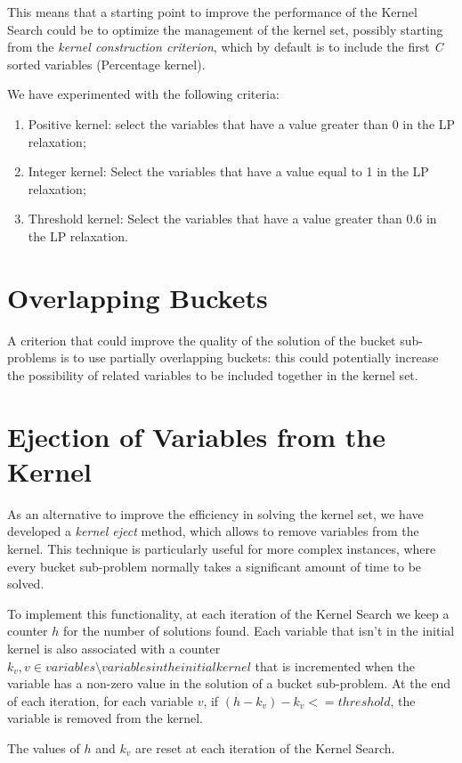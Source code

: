 This means that a starting point to improve the performance of the Kernel Search
could be to optimize the management of the kernel set,
possibly starting from the \textit{kernel construction criterion},
which by default is to include the first \textit{C} sorted variables
(Percentage kernel).

We have experimented with the following criteria:
\begin{enumerate}
    \item Positive kernel: select the variables that have a value greater than 0 in the LP relaxation;
    \item Integer kernel: Select the variables that have a value equal to 1 in the LP relaxation;
    \item Threshold kernel: Select the variables that have a value greater than 0.6
    in the LP relaxation.
\end{enumerate}


\section{Overlapping Buckets}
A criterion that could improve the quality of the solution of the bucket
sub-problems is to use partially overlapping buckets:
this could potentially increase the possibility of related
variables to be included together in the kernel set.


\section{Ejection of Variables from the Kernel}
As an alternative to improve the efficiency in solving the kernel set,
we have developed a \textit{kernel eject} method, which allows to remove variables from the kernel.
This technique is particularly useful for more complex instances, where every
bucket sub-problem normally takes a significant amount of time to be solved.

To implement this functionality, at each iteration of the Kernel Search
we keep a counter \(h\) for the number of solutions found.
Each variable that isn't in the initial kernel
is also associated with a counter \(k_{v}, v \in variables \setminus variables in the initial kernel\)
that is incremented when the variable has a non-zero value in the solution of a bucket sub-problem.
At the end of each iteration, for each variable \(v\), if
\((h - k_{v}) - k_{v} <= threshold\), the variable is removed from the kernel.

The values of \(h\) and \(k_{v}\) are reset at each iteration of the Kernel Search.


